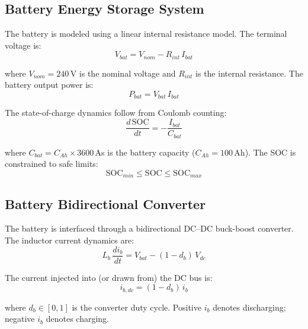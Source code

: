 \documentclass[journal]{IEEEtran}
\begin{document}
\subsection{Battery Energy Storage System}
\label{subsec:bess}

The battery is modeled using a linear internal resistance model. The
terminal voltage is:
\begin{equation}
V_{bat} = V_{nom} - R_{int}\,I_{bat}
\label{eq:bat_v}
\end{equation}

where $V_{nom} = 240$\,V is the nominal voltage and $R_{int}$ is the
internal resistance. The battery output power is:
\begin{equation}
P_{bat} = V_{bat}\,I_{bat}
\label{eq:bat_p}
\end{equation}

The state-of-charge dynamics follow from Coulomb counting:
\begin{equation}
\frac{d\,\text{SOC}}{dt} = -\frac{I_{bat}}{C_{bat}}
\label{eq:bat_soc}
\end{equation}

where $C_{bat} = C_{Ah} \times 3600$\,As is the battery capacity
($C_{Ah} = 100$\,Ah). The SOC is constrained to safe limits:
\begin{equation}
\text{SOC}_{min} \leq \text{SOC} \leq \text{SOC}_{max}
\label{eq:bat_soc_lim}
\end{equation}

\subsection{Battery Bidirectional Converter}
\label{subsec:bess_conv}

The battery is interfaced through a bidirectional DC--DC buck-boost
converter. The inductor current dynamics are:
\begin{equation}
L_b\,\frac{di_b}{dt} = V_{bat} - (1-d_b)\,V_{dc}
\label{eq:bess_conv}
\end{equation}

The current injected into (or drawn from) the DC bus is:
\begin{equation}
i_{b,dc} = (1-d_b)\,i_b
\label{eq:bess_ibus}
\end{equation}

where $d_b \in [0,1]$ is the converter duty cycle. Positive $i_b$ denotes
discharging; negative $i_b$ denotes charging.
\end{document}
